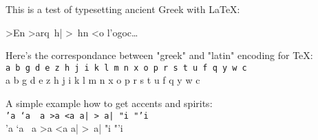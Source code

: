 \documentclass{article}
\begin{document}
This is a test of typesetting ancient Greek with LaTeX:


>En >arq~h| >~hn <o l'ogoc\dots

Here's the correspondance between "greek" and "latin" encoding for TeX:\\
\texttt{a b g d e z h j i k l m n x o p r s t u f q y w c} \\
%
a b g d e z h j i k l m n x o p r s t u f q y w c

A simple example how to get accents and spirits: \\
\texttt{'a `a ~a >a <a a| >~a| "i "'i} \\
%
'a `a ~a >a <a a| >~a| "i "'i 
\end{document}
